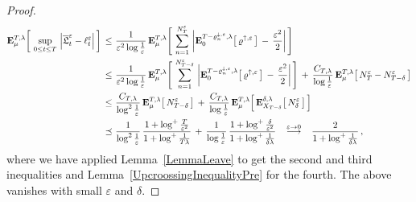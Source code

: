 \documentclass[10pt]{article}
\def\stackrel#1#2{\mathrel{\mathop{#2}\limits^{#1}}}
\numberwithin{equation}{section}
\theoremstyle{definition}
\begin{document}
\begin{proof}
\begin{align*}
\mathbf{E}_{\mu}^{T,\lambda}\bigg[\,\sup_{0\leq t\leq T}\,\Big|\overline{\mathfrak{L}}_{t}^{\varepsilon}- \ell_{t}^{\varepsilon} \Big|\,\bigg] \,\leq \,&\,
\frac{  1}{\varepsilon^2\log \frac{1}{\varepsilon}}\,\mathbf{E}_{\mu}^{T,\lambda}\Bigg[\,\sum_{n=1}^{ N_{T}^{\varepsilon} }\,  \bigg|\mathbf{E}_{0}^{T-\varrho_{n}^{\downarrow ,\varepsilon},\lambda}\big[\,\varrho^{\uparrow,\varepsilon} \,\big] \,-\,\frac{  \varepsilon^2}{2}\bigg|\,\Bigg] \nonumber \\
\,\leq \,&\,
\frac{  1}{\varepsilon^2\log\frac{1}{\varepsilon}}\,\mathbf{E}_{\mu}^{T,\lambda}\Bigg[\,\sum_{n=1}^{ N_{T-\delta}^{\varepsilon} } \, \bigg|\mathbf{E}_{0}^{T-\varrho_{n}^{\downarrow ,\varepsilon},\lambda}\big[\,\varrho^{\uparrow,\varepsilon} \,\big] \,-\,\frac{  \varepsilon^2}{2}\bigg|\,\Bigg]  \, +\,\frac{C_{T,\lambda}}{\log \frac{1}{\varepsilon} }\,\mathbf{E}_{\mu}^{T,\lambda}\big[\, N_{T}^{\varepsilon}-N_{T-\delta}^{\varepsilon}  \, \big] \nonumber 
 \\
\,\leq \,&\,
\frac{C_{T,\lambda} }{\log^2 \frac{1}{\varepsilon}  }\,\mathbf{E}_{\mu}^{T,\lambda}\big[\,  N_{T-\delta}^{\varepsilon} \,\big] \, +\,\frac{C_{T,\lambda}}{\log\frac{1}{\varepsilon}  }\,\mathbf{E}_{\mu}^{T,\lambda}\Big[ \,\mathbf{E}_{X_{T-\delta}}^{\delta,\lambda}\big[\,  N_{\delta}^{\varepsilon}\,   \big] \,   \Big] \nonumber  \\
\,\preceq \,&\,
\frac{1}{\log^2 \frac{1}{\varepsilon}  }\,\frac{ 1+\log^+\frac{T}{\varepsilon^2 }  }{1+\log^+ \frac{1}{T\lambda} } \, +\,\frac{1}{\log\frac{1}{\varepsilon}  }\,\frac{ 1+\log^+\frac{\delta}{\varepsilon^2 }  }{1+\log^+ \frac{1}{\delta\lambda} } \hspace{.3cm}\stackrel{ \varepsilon\rightarrow 0 }{\longrightarrow  } \hspace{.3cm}\frac{ 2  }{1+\log^+ \frac{1}{\delta\lambda} } \,,
\end{align*}
where we have applied  Lemma~\ref{LemmaLeave} to get the second and third inequalities  and Lemma~\ref{UpcroossingInequalityPre} for the fourth.  The above vanishes with small $\varepsilon$ and $\delta$.
\end{proof}
\end{document}
